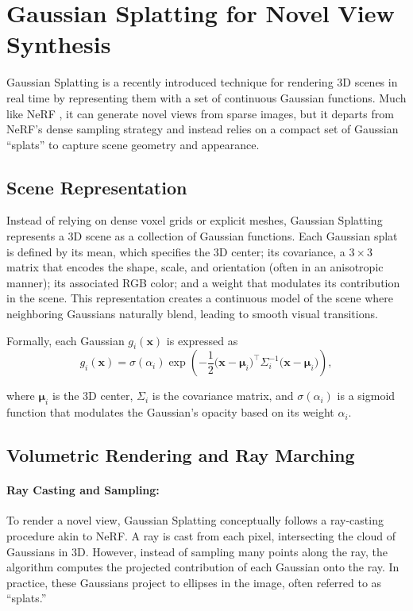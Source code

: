 \section{Gaussian Splatting for Novel View Synthesis}

Gaussian Splatting \cite{kerbl20233dgaussiansplattingrealtime} is a recently introduced technique for rendering 3D scenes in real time by representing them with a set of continuous Gaussian functions.
Much like NeRF \cite{mildenhall2020nerf}, it can generate novel views from sparse images, but it departs from NeRF's dense sampling strategy and instead relies on a compact set of Gaussian “splats” to capture scene geometry and appearance.

\subsection{Scene Representation}
Instead of relying on dense voxel grids or explicit meshes, Gaussian Splatting represents a 3D scene as a collection of Gaussian functions. 
Each Gaussian splat is defined by its mean, which specifies the 3D center; its covariance, a $3 \times 3$ matrix that encodes the shape, scale, and orientation (often in an anisotropic manner); its associated RGB color; and a weight that modulates its contribution in the scene. 
This representation creates a continuous model of the scene where neighboring Gaussians naturally blend, leading to smooth visual transitions.

Formally, each Gaussian $g_i(\mathbf{x})$ is expressed as
\begin{equation}
    g_i(\mathbf{x}) = \sigma(\alpha_i) \exp\left(-\frac{1}{2} \bigl(\mathbf{x} - \boldsymbol{\mu}_i\bigr)^\top \Sigma_i^{-1} \bigl(\mathbf{x} - \boldsymbol{\mu}_i\bigr)\right),
\end{equation}

where $\boldsymbol{\mu}_i$ is the 3D center, $\Sigma_i$ is the covariance matrix, and $\sigma(\alpha_i)$ is a sigmoid function that modulates the Gaussian's opacity based on its weight $\alpha_i$.

\subsection{Volumetric Rendering and Ray Marching}
\paragraph{Ray Casting and Sampling:}
To render a novel view, Gaussian Splatting conceptually follows a ray-casting procedure akin to NeRF.
A ray is cast from each pixel, intersecting the cloud of Gaussians in 3D.
However, instead of sampling many points along the ray, the algorithm computes the projected contribution of each Gaussian onto the ray.
In practice, these Gaussians project to ellipses in the image, often referred to as “splats.”

